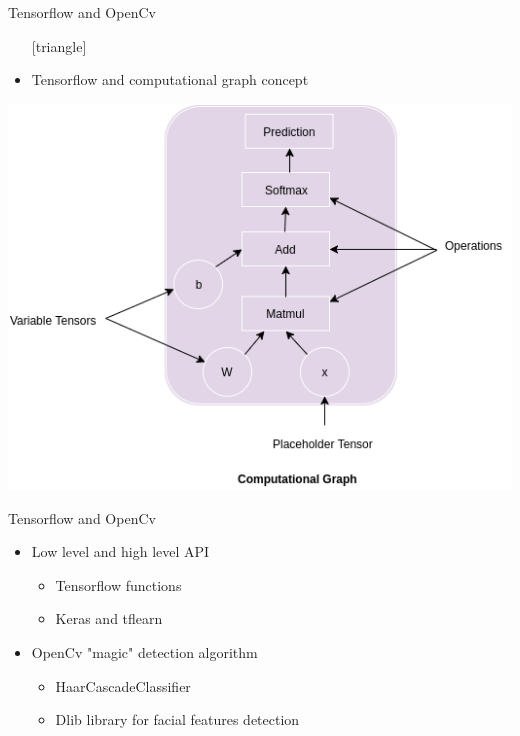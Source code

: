 \documentclass{beamer}
\begin{document}
\begin{frame}{Tensorflow and OpenCv}
  \begin{itemize}
\setlength\itemsep{1em}
[triangle]
\item Tensorflow and computational graph concept
\end{itemize}
\begin{center}
    \includegraphics[scale=0.4]{comp}
\end{center}
\end{frame}

\begin{frame}{Tensorflow and OpenCv}
\begin{itemize}
\setlength\itemsep{1em}
[triangle]
\item Low level and high level API
\begin{itemize}
[circle]
\item Tensorflow functions
\item Keras and tflearn
\end{itemize}
\item OpenCv "magic" detection algorithm
\begin{itemize}
[circle]
\item HaarCascadeClassifier
\item Dlib library for facial features detection
\end{itemize}
\end{itemize}
\end{frame}
\end{document}
